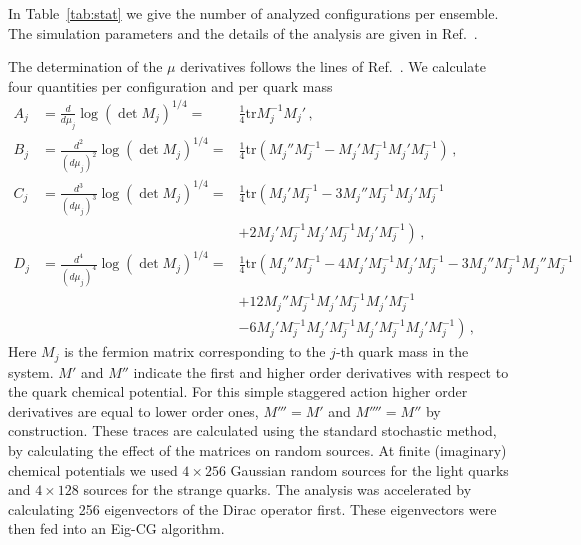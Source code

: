 \documentclass[a4paper,11pt]{article}
\newcommand\trt{\frac14\textrm{tr}}
\begin{document}
In Table~\ref{tab:stat} we give the number of analyzed configurations per ensemble.
The simulation parameters and the details of the analysis are given in Ref.~\cite{Bellwied:2015lba}.

The determination of the $\mu$ derivatives follows the lines of Ref.~\cite{Allton:2002zi,Bellwied:2015lba}.
We calculate four quantities per configuration and per quark mass
\begin{eqnarray}
A_j&=\frac{d}{d\mu_j} \log (\det M_j)^{1/4} = &\trt M_j^{-1} M_j'\,,\\
B_j&=\frac{d^2}{(d\mu_j)^2} \log(\det M_j)^{1/4} =&\trt\left(
M_j'' M_j^{-1}
-M_j' M_j^{-1} M_j' M_j^{-1}
\right)\,,\\
C_j&=\frac{d^3}{(d\mu_j)^3} \log(\det M_j)^{1/4} =&\trt\left(
M_j' M_j^{-1}
-3 M_j'' M_j^{-1} M_j' M_j^{-1}\right.\nonumber\\
&&
\left.
+2 M_j' M_j^{-1} M_j' M_j^{-1} M_j' M_j^{-1}
\right)\,,\\
D_j&=\frac{d^4}{(d\mu_j)^4} \log(\det M_j)^{1/4} = &\trt\left(
M_j'' M_j^{-1}
-4 M_j' M_j^{-1} M_j' M_j^{-1}
-3 M_j'' M_j^{-1} M_j'' M_j^{-1} \right.\nonumber\\
&&
\left.
+12 M_j'' M_j^{-1} M_j' M_j^{-1} M_j' M_j^{-1}\right.\nonumber\\
&&
\left.
-6 M_j' M_j^{-1} M_j' M_j^{-1} M_j' M_j^{-1}M_j' M_j^{-1}
\right)\,,
\end{eqnarray}
Here $M_j$ is the fermion matrix corresponding to the $j$-th quark mass in the system. $M'$ and $M''$ indicate
the first and higher order derivatives with respect to the quark chemical potential. For this simple staggered
action higher order derivatives are equal to lower order ones, $M'''=M'$ and $M''''=M''$ by construction.
These traces are calculated using the standard stochastic method, by calculating the effect of the matrices on random
sources.  At finite (imaginary) chemical potentials we used $4\times256$ Gaussian random sources for the light quarks
and $4\times128$ sources for the strange quarks. The analysis was accelerated by calculating 256 eigenvectors
of the Dirac operator first. These eigenvectors were then fed into an Eig-CG algorithm.
\end{document}
